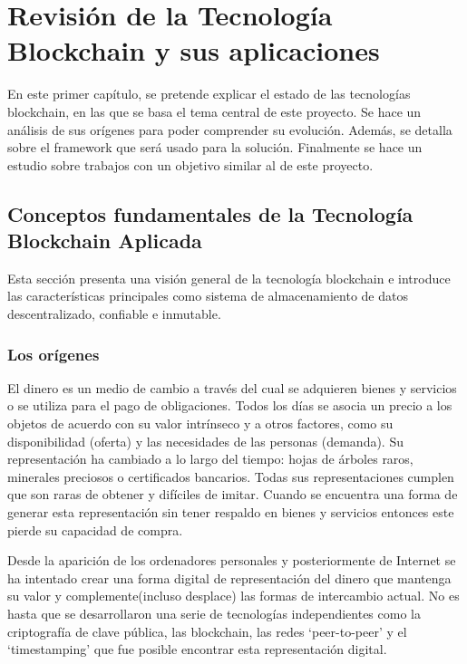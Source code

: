 \chapter{Revisión de la Tecnología Blockchain y sus aplicaciones}\label{chapter:state-of-the-art}

En este primer capítulo, se pretende explicar el estado de las tecnologías blockchain, en las que se basa el tema central de este proyecto.
Se hace un análisis de sus orígenes para poder comprender su evolución.
Además, se detalla sobre el framework que será usado para la solución.
Finalmente se hace un estudio sobre trabajos con un objetivo similar al de este proyecto.

\section{Conceptos fundamentales de la Tecnología Blockchain Aplicada}

Esta sección presenta una visión general de la tecnología blockchain e introduce las características principales como sistema de almacenamiento de datos descentralizado, confiable e inmutable.

\subsection{Los orígenes}

El dinero es un medio de cambio a través del cual se adquieren bienes y servicios o se utiliza para el pago de obligaciones. Todos los días se asocia un precio a los objetos de acuerdo con su valor intrínseco y a otros factores, como su disponibilidad (oferta) y las necesidades de las personas (demanda). Su representación ha cambiado a lo largo del tiempo: hojas de árboles raros, minerales preciosos o certificados bancarios. Todas sus representaciones cumplen que son raras de obtener y difíciles de imitar. Cuando se encuentra una forma de generar esta representación sin tener respaldo en bienes y servicios entonces este pierde su capacidad de compra.

Desde la aparición de los ordenadores personales y posteriormente de Internet se ha intentado crear una forma digital de representación del dinero que mantenga su valor y complemente(incluso desplace) las formas de intercambio actual. No es hasta que se desarrollaron una serie de tecnologías independientes como la criptografía de clave pública, las blockchain, las redes `peer-to-peer' y el  `timestamping' que fue posible encontrar esta representación digital.

